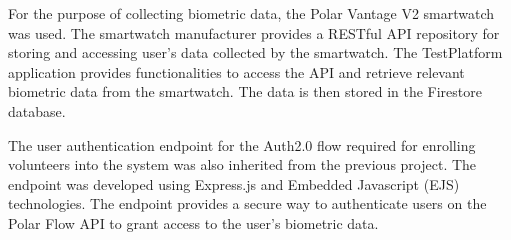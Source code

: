 For the purpose of collecting biometric data, the Polar Vantage V2 smartwatch was used. The smartwatch manufacturer provides a RESTful API
repository for storing and accessing user's data collected by the smartwatch. The TestPlatform application provides functionalities to 
access the API and retrieve relevant biometric data from the smartwatch. The data is then stored in the Firestore database.

The user authentication endpoint for the Auth2.0 flow required for enrolling volunteers into the system was also inherited from the previous project. 
The endpoint was developed using Express.js and Embedded Javascript (EJS) technologies. The endpoint provides a secure way to authenticate
users on the Polar Flow API to grant access to the user's biometric data. 